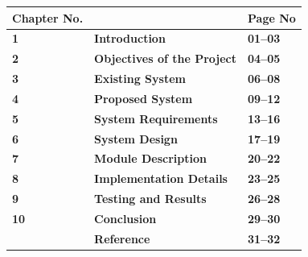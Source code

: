 \begin{center}
\renewcommand{\arraystretch}{1.45}
\begin{tabular}{|>{\centering\arraybackslash}m{2.8cm}|>{\raggedright\arraybackslash}m{7.8cm}|>{\centering\arraybackslash}m{2.8cm}|}
\hline
\textbf{Chapter No.} & \multicolumn{1}{c|}{\textbf{Chapters}} & \textbf{Page No} \\
\hline
\textbf{1} & \hspace{0.4cm}\textbf{Introduction} & \textbf{01--03} \\
\hline
\textbf{2} & \hspace{0.4cm}\textbf{Objectives of the Project} & \textbf{04--05} \\
\hline
\textbf{3} & \hspace{0.4cm}\textbf{Existing System} & \textbf{06--08} \\
\hline
\textbf{4} & \hspace{0.4cm}\textbf{Proposed System} & \textbf{09--12} \\
\hline
\textbf{5} & \hspace{0.4cm}\textbf{System Requirements} & \textbf{13--16} \\
\hline
\textbf{6} & \hspace{0.4cm}\textbf{System Design} & \textbf{17--19} \\
\hline
\textbf{7} & \hspace{0.4cm}\textbf{Module Description} & \textbf{20--22} \\
\hline
\textbf{8} & \hspace{0.4cm}\textbf{Implementation Details} & \textbf{23--25} \\
\hline
\textbf{9} & \hspace{0.4cm}\textbf{Testing and Results} & \textbf{26--28} \\
\hline
\textbf{10} & \hspace{0.4cm}\textbf{Conclusion} & \textbf{29--30} \\
\hline
 & \hspace{0.4cm}\textbf{Reference} & \textbf{31--32} \\
\hline
\end{tabular}
\end{center}
\newpage
